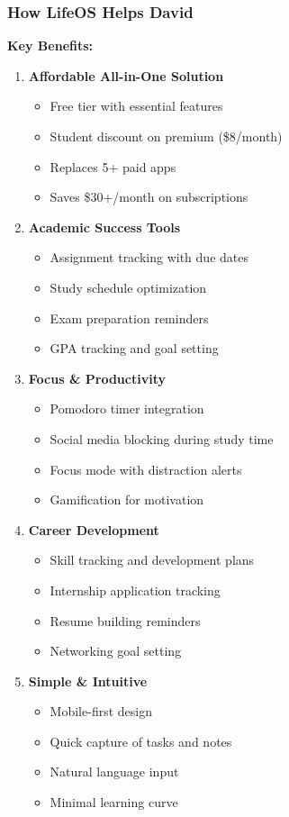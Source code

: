 \subsubsection{How LifeOS Helps David}

\textbf{Key Benefits:}

\begin{enumerate}
    \item \textbf{Affordable All-in-One Solution}
    \begin{itemize}
        \item Free tier with essential features
        \item Student discount on premium (\$8/month)
        \item Replaces 5+ paid apps
        \item Saves \$30+/month on subscriptions
    \end{itemize}
    
    \item \textbf{Academic Success Tools}
    \begin{itemize}
        \item Assignment tracking with due dates
        \item Study schedule optimization
        \item Exam preparation reminders
        \item GPA tracking and goal setting
    \end{itemize}
    
    \item \textbf{Focus \& Productivity}
    \begin{itemize}
        \item Pomodoro timer integration
        \item Social media blocking during study time
        \item Focus mode with distraction alerts
        \item Gamification for motivation
    \end{itemize}
    
    \item \textbf{Career Development}
    \begin{itemize}
        \item Skill tracking and development plans
        \item Internship application tracking
        \item Resume building reminders
        \item Networking goal setting
    \end{itemize}
    
    \item \textbf{Simple \& Intuitive}
    \begin{itemize}
        \item Mobile-first design
        \item Quick capture of tasks and notes
        \item Natural language input
        \item Minimal learning curve
    \end{itemize}
\end{enumerate}

